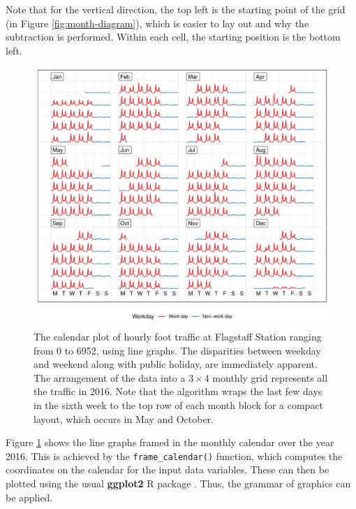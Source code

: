 \documentclass[12pt]{article}
\begin{document}
Note that for the vertical direction, the top left is the starting point of the grid (in Figure \ref{fig:month-diagram}), which is easier to lay out and why the subtraction is performed. Within each cell, the starting position is the bottom left.

\begin{figure}

{\centering \includegraphics[width=\textwidth]{figure/fs-2016-1} 

}

\caption{The calendar plot of hourly foot traffic at Flagstaff Station ranging from 0 to 6952, using line graphs. The disparities between weekday and weekend along with public holiday, are immediately apparent. The arrangement of the data into a \(3 \times 4\) monthly grid represents all the traffic in 2016. Note that the algorithm wraps the last few days in the sixth week to the top row of each month block for a compact layout, which occurs in May and October.}\label{fig:fs-2016}
\end{figure}



Figure \ref{fig:fs-2016} shows the line graphs framed in the monthly calendar over the year 2016. This is achieved by the \texttt{frame\_calendar()} function, which computes the coordinates on the calendar for the input data variables. These can then be plotted using the usual \textbf{ggplot2} R package \citep{R-ggplot2}. Thus, the grammar of graphics can be applied.
\end{document}
